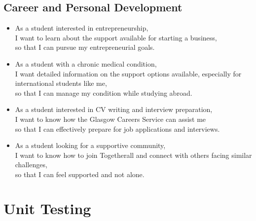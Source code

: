 \documentclass{l4proj}
\begin{document}
\begin{appendices}
\section*{Career and Personal Development}
\begin{itemize}
    \item As a student interested in entrepreneurship, \\I want to learn about the support available for starting a business, \\so that I can pursue my entrepreneurial goals.
    \vspace{1em}
    \item As a student with a chronic medical condition, \\I want detailed information on the support options available, especially for international students like me, \\so that I can manage my condition while studying abroad.
    \vspace{1em}
    \item As a student interested in CV writing and interview preparation, \\I want to know how the Glasgow Careers Service can assist me \\so that I can effectively prepare for job applications and interviews.
    \vspace{1em}
    \item As a student looking for a supportive community, \\I want to know how to join Togetherall and connect with others facing similar challenges, \\so that I can feel supported and not alone.
\end{itemize}


\chapter{Unit Testing}
\label{Unit Testing}


\end{appendices}
\end{document}
